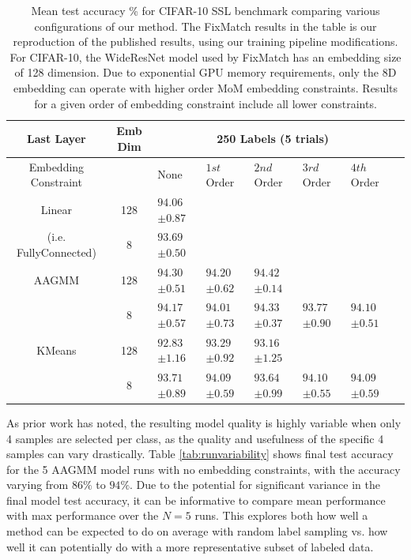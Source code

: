 \documentclass[10pt,twocolumn,letterpaper]{article}
\begin{document}
\begin{table}[ht!]
\begin{tabularx}{\textwidth}{c|c|XXXXXX}
		\hline\hline
		Last Layer  &   Emb Dim  & \multicolumn{5}{c}{250 Labels (5 trials)}            \\ 
		\hline
		\multicolumn{1}{c|}{Embedding Constraint} &  & None & $1st$ Order & $2nd$ Order & $3rd$ Order & $4th$ Order  \\ 
		\hline
		Linear & 128  & $94.06$ \scriptsize{$\pm 0.87$}   &  &  &  &   \\
		(i.e. FullyConnected) & 8  & $93.69$ \scriptsize{$\pm 0.50$}      &  &  &  &   \\
		\hline
		AAGMM & 128  & $94.30$ \scriptsize{$\pm 0.51$}    & $94.20$ \scriptsize{$\pm 0.62$} & $94.42$ \scriptsize{$\pm 0.14$} &  &  \\
		& 8  & $94.17$ \scriptsize{$\pm 0.57$}    & $94.01$ \scriptsize{$\pm 0.73$} & $94.33$ \scriptsize{$\pm 0.37$} & $93.77$ \scriptsize{$\pm 0.90$} & $94.10$ \scriptsize{$\pm 0.51$} \\
		\hline
		KMeans & 128  & $92.83$ \scriptsize{$\pm 1.16$}    & $93.29$ \scriptsize{$\pm 0.92$} & $93.16$ \scriptsize{$\pm 1.25$} &  &  \\
		& 8  & $93.71$ \scriptsize{$\pm 0.89$}    & $94.09$ \scriptsize{$\pm 0.59$} & $93.64$ \scriptsize{$\pm 0.99$} & $94.10$ \scriptsize{$\pm 0.55$} & $94.09$ \scriptsize{$\pm 0.59$}  \\
	\end{tabularx}
	\caption{Mean test accuracy \% for CIFAR-10 SSL benchmark comparing various configurations of our method. The FixMatch results in the table is our reproduction of the published results, using our training pipeline modifications. For CIFAR-10, the WideResNet model used by FixMatch has an embedding size of 128 dimension. Due to exponential GPU memory requirements, only the 8D embedding can operate with higher order MoM embedding constraints. Results for a given order of embedding constraint include all lower constraints.}
	\label{table1}
\end{table}

As prior work \cite{sohn2020fixmatch} has noted, the resulting model quality is highly variable when only 4 samples are selected per class, as the quality and usefulness of the specific 4 samples can vary drastically. 
Table \ref{tab:runvariability} shows final test accuracy for the 5 AAGMM model runs with no embedding constraints, with the accuracy varying from $86\%$ to $94\%$.
Due to the potential for significant variance in the final model test accuracy, it can be informative to compare mean performance with max performance over the $N=5$ runs.
This explores both how well a method can be expected to do on average with random label sampling vs. how well it can potentially do with a more representative subset of labeled data.
\end{document}
